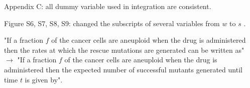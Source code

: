 \documentclass[12pt]{extarticle}
\begin{document}
Appendix C: all dummy variable used in integration are consistent. %

Figure S6, S7, S8, S9: changed the subscripts of several variables from $w$ to $s$ . %

"If a fraction $f$ of the cancer cells are aneuploid when the drug is administered then the rates at which the rescue mutations are generated can be written as" $\rightarrow$
"If a fraction $f$ of the cancer cells are aneuploid when the drug is administered then the expected number of successful mutants generated until time $t$ is given by". %




\end{document}
